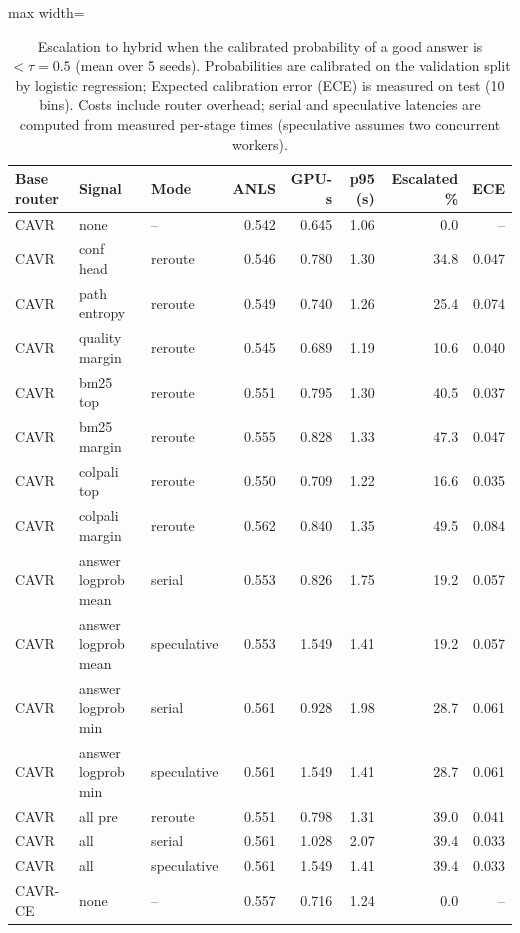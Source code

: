 \begin{table}[t]
\centering
\caption{Escalation to hybrid when the calibrated probability of a good answer is $<\tau = 0.5$ (mean over 5 seeds). Probabilities are calibrated on the validation split by logistic regression; Expected calibration error (ECE) is measured on test (10 bins). Costs include router overhead; serial and speculative latencies are computed from measured per-stage times (speculative assumes two concurrent workers).}
\label{tab:escalation}
\begin{adjustbox}{max width=\linewidth}
\begin{tabular}{lllrrrrr}
\toprule
\textbf{Base router} & \textbf{Signal} & \textbf{Mode} & \textbf{ANLS} & \textbf{GPU-s} & \textbf{p95 (s)} & \textbf{Escalated \%} & \textbf{ECE} \\
\midrule
CAVR & none & -- & 0.542 & 0.645 & 1.06 & 0.0 & -- \\
CAVR & conf head & reroute & 0.546 & 0.780 & 1.30 & 34.8 & 0.047 \\
CAVR & path entropy & reroute & 0.549 & 0.740 & 1.26 & 25.4 & 0.074 \\
CAVR & quality margin & reroute & 0.545 & 0.689 & 1.19 & 10.6 & 0.040 \\
CAVR & bm25 top & reroute & 0.551 & 0.795 & 1.30 & 40.5 & 0.037 \\
CAVR & bm25 margin & reroute & 0.555 & 0.828 & 1.33 & 47.3 & 0.047 \\
CAVR & colpali top & reroute & 0.550 & 0.709 & 1.22 & 16.6 & 0.035 \\
CAVR & colpali margin & reroute & 0.562 & 0.840 & 1.35 & 49.5 & 0.084 \\
CAVR & answer logprob mean & serial & 0.553 & 0.826 & 1.75 & 19.2 & 0.057 \\
CAVR & answer logprob mean & speculative & 0.553 & 1.549 & 1.41 & 19.2 & 0.057 \\
CAVR & answer logprob min & serial & 0.561 & 0.928 & 1.98 & 28.7 & 0.061 \\
CAVR & answer logprob min & speculative & 0.561 & 1.549 & 1.41 & 28.7 & 0.061 \\
CAVR & all pre & reroute & 0.551 & 0.798 & 1.31 & 39.0 & 0.041 \\
CAVR & all & serial & 0.561 & 1.028 & 2.07 & 39.4 & 0.033 \\
CAVR & all & speculative & 0.561 & 1.549 & 1.41 & 39.4 & 0.033 \\
CAVR-CE & none & -- & 0.557 & 0.716 & 1.24 & 0.0 & -- \\

\end{tabular}
\end{adjustbox}
\end{table}
